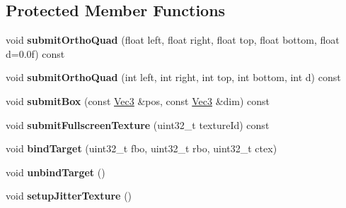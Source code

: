 \subsection*{\-Protected \-Member \-Functions}
\begin{DoxyCompactItemize}
\item 
\hypertarget{class_verdi_1_1_default_render_strategy_a6c40d0af0dc898879f71da22e0d673ab}{void {\bfseries submit\-Ortho\-Quad} (float left, float right, float top, float bottom, float d=0.\-0f) const }\label{class_verdi_1_1_default_render_strategy_a6c40d0af0dc898879f71da22e0d673ab}

\item 
\hypertarget{class_verdi_1_1_default_render_strategy_a1ccdf7d677e54a139455235c4ed2b393}{void {\bfseries submit\-Ortho\-Quad} (int left, int right, int top, int bottom, int d) const }\label{class_verdi_1_1_default_render_strategy_a1ccdf7d677e54a139455235c4ed2b393}

\item 
\hypertarget{class_verdi_1_1_default_render_strategy_ab75b0f86b9adce718f4208ec48d77432}{void {\bfseries submit\-Box} (const \hyperlink{class_verdi_1_1_vec3}{\-Vec3} \&pos, const \hyperlink{class_verdi_1_1_vec3}{\-Vec3} \&dim) const }\label{class_verdi_1_1_default_render_strategy_ab75b0f86b9adce718f4208ec48d77432}

\item 
\hypertarget{class_verdi_1_1_default_render_strategy_a82b8b144f72f443198c0ec27f7c7d8a2}{void {\bfseries submit\-Fullscreen\-Texture} (uint32\-\_\-t texture\-Id) const }\label{class_verdi_1_1_default_render_strategy_a82b8b144f72f443198c0ec27f7c7d8a2}

\item 
\hypertarget{class_verdi_1_1_default_render_strategy_a2be8429f52cfd28bcb4298adbb0ba338}{void {\bfseries bind\-Target} (uint32\-\_\-t fbo, uint32\-\_\-t rbo, uint32\-\_\-t ctex)}\label{class_verdi_1_1_default_render_strategy_a2be8429f52cfd28bcb4298adbb0ba338}

\item 
\hypertarget{class_verdi_1_1_default_render_strategy_a7d7cfde1afedf0538914d579948aecbc}{void {\bfseries unbind\-Target} ()}\label{class_verdi_1_1_default_render_strategy_a7d7cfde1afedf0538914d579948aecbc}

\item 
\hypertarget{class_verdi_1_1_default_render_strategy_a4c0a0f83fd2cacc2a52d54af47fff950}{void {\bfseries setup\-Jitter\-Texture} ()}\label{class_verdi_1_1_default_render_strategy_a4c0a0f83fd2cacc2a52d54af47fff950}


\end{DoxyCompactItemize}
